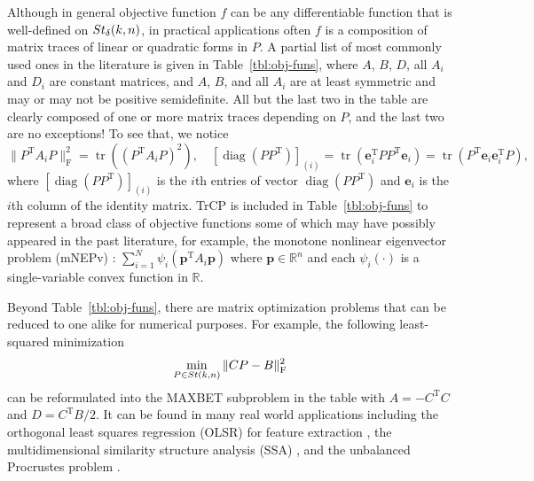 \documentclass[11pt]{article}
\def\be{\pmb{e}}
\def\bp{\pmb{p}}
\def\bbR{\mathbb{R}}
\newcommand\STM[2]{{\rm St}(#1,#2)}
\newcommand\STMnbr{{\rm St}_{\delta}(k,n)}
\DeclareMathOperator{\diag}{diag}
\DeclareMathOperator{\tr}{tr}
\DeclareMathOperator{\F}{F}
\DeclareMathOperator{\T}{T}
\theoremstyle{definition}
\numberwithin{equation}{section}
\begin{document}
Although in general objective function $f$ can be any differentiable function
that is well-defined on $\STMnbr$, in practical applications often $f$ is a composition of
matrix traces of linear or quadratic forms in $P$. A partial list of most commonly used ones in the literature is given
in Table~\ref{tbl:obj-funs}, where
$A$, $B$, $D$, all $A_i$ and $D_i$ are constant matrices, and $A$, $B$, and all $A_i$ are at least symmetric and may or may not be
positive semidefinite.
All but the last two in the table  are clearly composed of one or more matrix traces depending on $P$, and
the last two are no exceptions! To see that, we notice
$$
\|P^{\T}A_iP\|_{\F}^2=\tr((P^{\T}A_iP)^2), \quad
[\diag(PP^{\T})]_{(i)}=\tr(\be_i^{\T}PP^{\T}\be_i)=\tr(P^{\T}\be_i\be_i^{\T}P),
$$
where $[\diag(PP^{\T})]_{(i)}$ is the $i$th entries of vector $\diag(PP^{\T})$ and
 $\be_i$ is the $i$th column of the identity matrix.
TrCP is included in Table~\ref{tbl:obj-funs} to represent a broad class of objective functions some of which may have possibly appeared in the past literature, for example,
the monotone nonlinear eigenvector problem (mNEPv) \cite{balu:2024}: $\sum_{i=1}^N\psi_i(\bp^{\T}A_i\bp)$
        where $\bp\in\bbR^n$ and each $\psi_i(\cdot)$ is a single-variable convex function in $\bbR$.

Beyond Table~\ref{tbl:obj-funs}, there are matrix optimization problems
 that can be reduced to one alike for numerical purposes. For example,
the following least-squared minimization
 \begin{equation}\label{eq:OPLS}
\min_{P\in \STM{k}{n}}\|CP-B\|_{\F}^2
\end{equation}
can be reformulated into the MAXBET subproblem in the table with $A=-C^{\T}C$ and $D=C^{\T}B/2$.
It can be found in many real world applications
including
the orthogonal least squares regression (OLSR)
for feature extraction \cite{zhwn:2016,nizl:2017}, the  multidimensional similarity structure analysis (SSA) \cite[chapter 19]{boli:1987}, and  the unbalanced Procrustes problem \cite{chtr:2001,edas:1999,elpa:1999,godi:2004,huca:1962,zhys:2020,zhdu:2006}.
\end{document}
